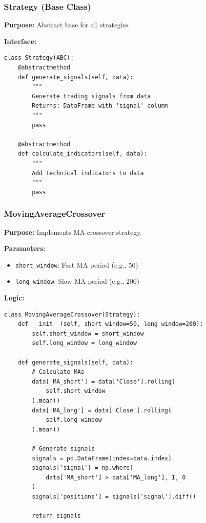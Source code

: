 \documentclass[11pt,a4paper]{article}
\begin{document}
\subsubsection{Strategy (Base Class)}

\textbf{Purpose:} Abstract base for all strategies.

\textbf{Interface:}
\begin{lstlisting}[style=pythoncode]
class Strategy(ABC):
    @abstractmethod
    def generate_signals(self, data):
        """
        Generate trading signals from data
        Returns: DataFrame with 'signal' column
        """
        pass
    
    @abstractmethod
    def calculate_indicators(self, data):
        """
        Add technical indicators to data
        """
        pass
\end{lstlisting}

\subsubsection{MovingAverageCrossover}

\textbf{Purpose:} Implements MA crossover strategy.

\textbf{Parameters:}
\begin{itemize}
  \item \texttt{short\_window}: Fast MA period (e.g., 50)
  \item \texttt{long\_window}: Slow MA period (e.g., 200)
\end{itemize}

\textbf{Logic:}
\begin{lstlisting}[style=pythoncode]
class MovingAverageCrossover(Strategy):
    def __init__(self, short_window=50, long_window=200):
        self.short_window = short_window
        self.long_window = long_window
        
    def generate_signals(self, data):
        # Calculate MAs
        data['MA_short'] = data['Close'].rolling(
            self.short_window
        ).mean()
        data['MA_long'] = data['Close'].rolling(
            self.long_window
        ).mean()
        
        # Generate signals
        signals = pd.DataFrame(index=data.index)
        signals['signal'] = np.where(
            data['MA_short'] > data['MA_long'], 1, 0
        )
        signals['positions'] = signals['signal'].diff()
        
        return signals
\end{lstlisting}
\end{document}
